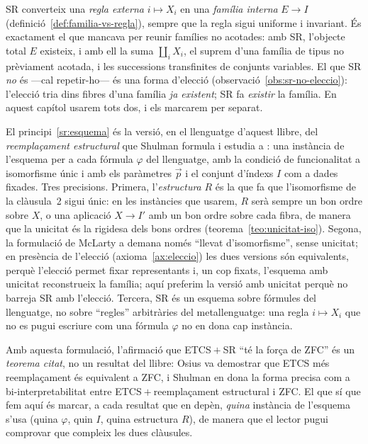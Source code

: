 \begin{observacio}\label{obs:sr-abast}
SR converteix una \emph{regla externa} \(i\mapsto X_i\) en una \emph{família
interna} \(E\to I\) (definició~\ref{def:familia-vs-regla}), sempre que la regla
sigui uniforme i invariant. És exactament el que mancava per reunir famílies no
acotades: amb SR, l'objecte total \(E\) existeix, i amb ell la suma
\(\coprod_i X_i\), el suprem d'una família de tipus no prèviament acotada, i les
successions transfinites de conjunts variables. El que SR \emph{no} és ---cal
repetir-ho--- és una forma d'elecció (observació~\ref{obs:sr-no-eleccio}):
l'elecció tria dins fibres d'una família \emph{ja existent}; SR fa \emph{existir}
la família. En aquest capítol usarem tots dos, i els marcarem per separat.
\end{observacio}

\begin{observacio}\label{obs:sr-rigor}
El principi~\ref{sr:esquema} és la versió, en el llenguatge d'aquest llibre, del
\emph{reemplaçament estructural} que Shulman formula i estudia a
\cite{shulman-comparing}: una instància de l'esquema per a cada fórmula
\(\varphi\) del llenguatge, amb la condició de funcionalitat a isomorfisme únic
i amb els paràmetres \(\vec p\) i el conjunt d'índexs \(I\) com a dades fixades.
Tres precisions. Primera, l'\emph{estructura} \(R\) és la que fa que l'isomorfisme
de la clàusula~2 sigui únic: en les instàncies que usarem, \(R\) serà sempre un bon ordre sobre \(X\), o una aplicació
\(X\to I'\) amb un bon ordre sobre cada fibra, de manera que la unicitat és
la rigidesa dels bons ordres
(teorema~\ref{teo:unicitat-iso}). Segona, la formulació de McLarty a
\cite{mclarty-catset} demana només \enquote{llevat d'isomorfisme}, sense
unicitat; en presència de l'elecció (axioma~\ref{ax:eleccio}) les dues versions
són equivalents, perquè l'elecció permet fixar representants i, un cop fixats,
l'esquema amb unicitat reconstrueix la família; aquí preferim la versió amb
unicitat perquè no barreja SR amb l'elecció. Tercera, SR és un esquema sobre
fórmules del llenguatge, no sobre \enquote{regles} arbitràries del
metallenguatge: una regla \(i\mapsto X_i\) que no es pugui escriure com una
fórmula \(\varphi\) no en dona cap instància.

Amb aquesta formulació, l'afirmació que ETCS${}+{}$SR \enquote{té la força de
ZFC} és un \emph{teorema citat}, no un resultat del llibre: Osius
\cite{osius1974} va demostrar que ETCS més reemplaçament és equivalent a ZFC,
i Shulman \cite{shulman-comparing} en dona la forma precisa com a
bi-interpretabilitat entre ETCS${}+{}$reemplaçament estructural i ZFC. El
que sí que fem aquí és marcar, a cada resultat que en depèn, \emph{quina}
instància de l'esquema s'usa (quina \(\varphi\), quin \(I\), quina estructura
\(R\)), de manera que el lector pugui comprovar que compleix les dues clàusules.
\end{observacio}

